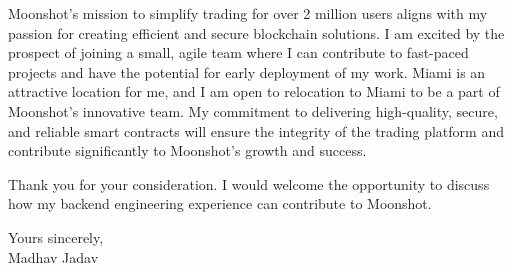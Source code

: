 \documentclass[10pt,letterpaper]{article}
\begin{document}
Moonshot's mission to simplify trading for over 2 million users aligns with my passion for creating efficient and secure blockchain solutions. I am excited by the prospect of joining a small, agile team where I can contribute to fast-paced projects and have the potential for early deployment of my work. Miami is an attractive location for me, and I am open to relocation to Miami to be a part of Moonshot's innovative team. My commitment to delivering high-quality, secure, and reliable smart contracts will ensure the integrity of the trading platform and contribute significantly to Moonshot's growth and success.

Thank you for your consideration. I would welcome the opportunity to discuss how my backend engineering experience can contribute to Moonshot.

Yours sincerely,\\[8pt]
Madhav Jadav
\end{document}
